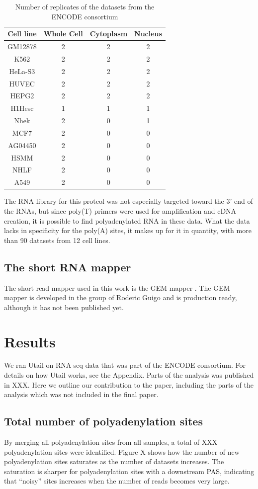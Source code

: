 \begin{table}
	\centering
	\begin{tabular}{cccc}
	  Cell line & Whole Cell & Cytoplasm & Nucleus \\
	  \midrule
	  GM12878 & 2 & 2 & 2 \\
	  K562 & 2 & 2 & 2 \\
	  HeLa-S3 & 2 & 2 & 2 \\
	  HUVEC & 2 & 2 & 2 \\
	  HEPG2 & 2 & 2 & 2 \\
	  H1Hesc & 1 & 1 & 1 \\
	  Nhek & 2 & 0 & 1 \\
	  MCF7 & 2 & 0 & 0 \\
	  AG04450 & 2 & 0 & 0 \\
	  HSMM & 2 & 0 & 0 \\
	  NHLF & 2 & 0 & 0 \\
	  A549 & 2 & 0 & 0 \\
	\end{tabular}
	\caption{Number of replicates of the datasets from the ENCODE consortium}
	\label{tab:Datasets}
\end{table}

The RNA library for this protcol was not especially targeted toward the 3' end
of the RNAs, but since poly(T) primers were used for amplification and cDNA
creation, it is possible to find polyadenylated RNA in these data. What the
data lacks in specificity for the poly(A) sites, it makes up for it in
quantity, with more than 90 datasets from 12 cell lines.

\subsection{The short RNA mapper}
The short read mapper used in this work is the GEM mapper
\cite{ribeca_gem_2010}. The GEM mapper is developed in the group of Roderic
Guigo and is production ready, although it has not been published yet.

\section{Results}
We ran Utail on RNA-seq data that was part of the ENCODE consortium. For
details on how Utail works, see the Appendix. Parts of the analysis was
published in XXX. Here we outline our contribution to the paper, including the
parts of the analysis which was not included in the final paper.

\subsection{Total number of polyadenylation sites}
By merging all polyadenylation sites from all samples, a total of XXX
polyadenylation sites were identified. Figure X shows how the number of new
polyadenylation sites saturates as the number of datasets increases. The
saturation is sharper for polyadenylation sites with a downstream PAS,
indicating that ``noisy'' sites increases when the number of reads becomes very
large.

